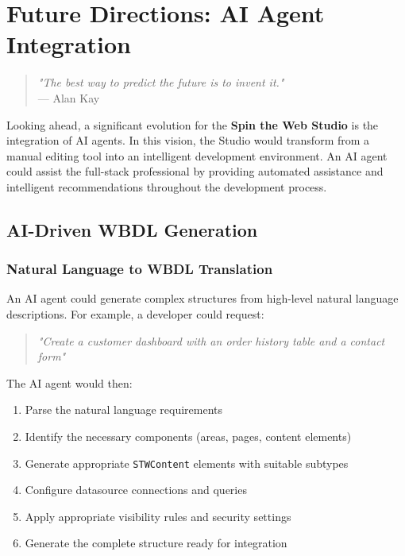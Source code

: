 
\chapter{Future Directions: AI Agent Integration}
\label{chap:future-directions}

\begin{quote}
\textit{"The best way to predict the future is to invent it."} \\
— Alan Kay
\end{quote}

Looking ahead, a significant evolution for the \textbf{Spin the Web Studio} is the integration of AI agents. In this vision, the Studio would transform from a manual editing tool into an intelligent development environment. An AI agent could assist the full-stack professional by providing automated assistance and intelligent recommendations throughout the development process.

\section{AI-Driven WBDL Generation}
\label{sec:ai-wbdl-generation}

\subsection{Natural Language to WBDL Translation}

An AI agent could generate complex \wbdl{} structures from high-level natural language descriptions. For example, a developer could request:

\begin{quote}
\textit{"Create a customer dashboard with an order history table and a contact form"}
\end{quote}

The AI agent would then:
\begin{enumerate}
\item Parse the natural language requirements
\item Identify the necessary \wbdl{} components (areas, pages, content elements)
\item Generate appropriate \texttt{STWContent} elements with suitable subtypes
\item Configure datasource connections and queries
\item Apply appropriate visibility rules and security settings
\item Generate the complete \wbdl{} structure ready for integration
\end{enumerate}

